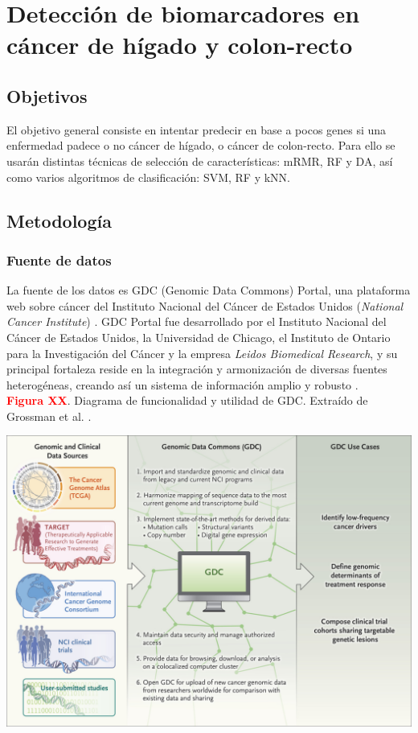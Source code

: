 \chapter{Detección de biomarcadores en cáncer de hígado y colon-recto}

\section{Objetivos}

El objetivo general consiste en intentar predecir en base a pocos genes si una enfermedad padece o no cáncer de hígado, o cáncer de colon-recto. Para ello se usarán distintas técnicas de selección de características: mRMR, RF y DA, así como varios algoritmos de clasificación: SVM, RF y kNN.

\section{Metodología}

\subsection{Fuente de datos}

La fuente de los datos es GDC (Genomic Data Commons) Portal, una plataforma web sobre cáncer del Instituto Nacional del Cáncer de Estados Unidos (\textit{National Cancer Institute}) \cite{GDCPortal, NationalCancerInstitute}. GDC Portal fue desarrollado por el Instituto Nacional del Cáncer de Estados Unidos, la Universidad de Chicago, el Instituto de Ontario para la Investigación del Cáncer y la empresa \textit{Leidos Biomedical Research}, y su principal fortaleza reside en la integración y armonización de diversas fuentes heterogéneas, creando así un sistema de información amplio y robusto \cite{Grossman2016}. \\

\newpage
\textbf{\textcolor{red}{Figura XX}}. Diagrama de funcionalidad y utilidad de GDC. Extraído de Grossman et al. \cite{Grossman2016}.
\begin{center}
	\includegraphics[width=1\textwidth]{figuras/funcionamiento_gdc.jpeg} \\
\end{center}

